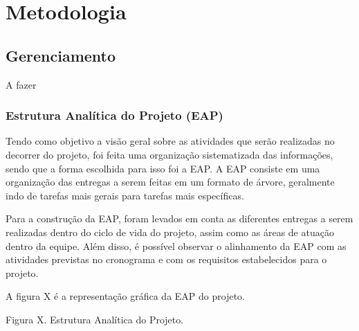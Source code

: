 \chapter[Metodologia]{Metodologia}

\section{Gerenciamento}

A fazer

\subsection{Estrutura Analítica do Projeto (EAP)}

Tendo como objetivo a visão geral sobre as atividades que serão realizadas no decorrer do projeto, foi feita uma organização sistematizada das informações, sendo que a forma escolhida para isso foi a EAP. A EAP consiste em uma organização das entregas a serem feitas em um formato de árvore, geralmente indo de tarefas mais gerais para tarefas mais específicas.

Para a construção da EAP, foram levados em conta as diferentes entregas a serem realizadas dentro do ciclo de vida do projeto, assim como as áreas de atuação dentro da equipe. Além disso, é possível observar o alinhamento da EAP com as atividades previstas no cronograma e com os requisitos estabelecidos para o projeto.

A figura X é a representação gráfica da EAP do projeto.

Figura X. Estrutura Analítica do Projeto.
